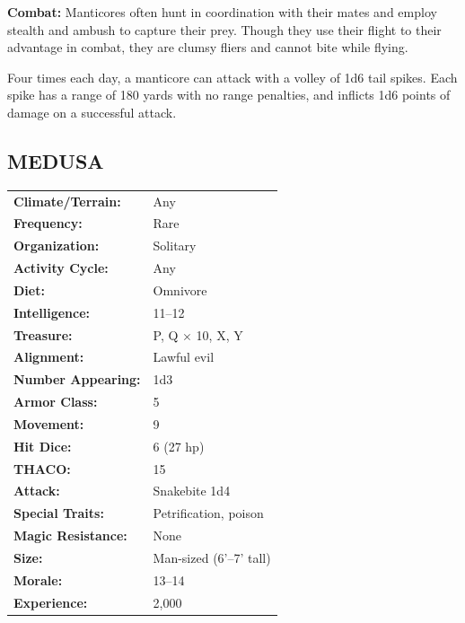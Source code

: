 \begin{multicols}{2}
\textbf{Combat:} Manticores often hunt in coordination with their mates and employ stealth and ambush to capture their prey. Though they use their flight to their advantage in combat, they are clumsy fliers and cannot bite while flying.

Four times each day, a manticore can attack with a volley of 1d6 tail spikes. Each spike has a range of 180 yards with no range penalties, and inflicts 1d6 points of damage on a successful attack.

\noindent
\begin{minipage}{\columnwidth}

\vspace{1em}

\subsection{MEDUSA}

\noindent \begin{tabular}{p{}p{}}
\textbf{Climate/Terrain:}	& Any	\\
\textbf{Frequency:} 		& Rare	\\
\textbf{Organization:} 		& Solitary	\\
\textbf{Activity Cycle:} 	& Any	\\
\textbf{Diet:} 				& Omnivore	\\
\textbf{Intelligence:} 		& 11--12	\\
\textbf{Treasure:} 			& P, Q $\times$ 10, X, Y	\\
\textbf{Alignment:} 		& Lawful evil	\\
\hline
\textbf{Number Appearing:} 	& 1d3	\\
\textbf{Armor Class:} 		& 5	\\
\textbf{Movement:} 			& 9	\\
\textbf{Hit Dice:} 			& 6	(27 hp)	\\
\textbf{THACO:} 			& 15	\\
\textbf{Attack:} 			& Snakebite 1d4	\\
\textbf{Special Traits:} & Petrification, poison	\\
\textbf{Magic Resistance:} 	& None	\\
\textbf{Size:} 				& Man-sized (6'--7' tall)	\\
\textbf{Morale:} 			& 13--14	\\
\textbf{Experience:} 		& 2,000	\\
\end{tabular}


\end{minipage}
\end{multicols}
